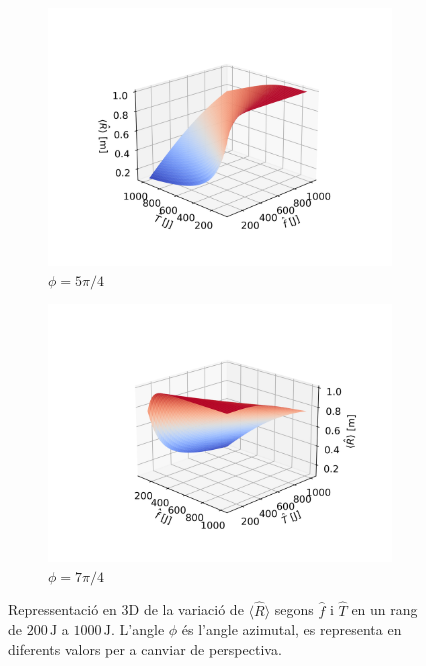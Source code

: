 \documentclass[12pt,twosides,onecolumn,openany]{article}
\begin{document}
\begin{figure}[h]
\begin{subfigure}[b]{0.48\textwidth}
         \includegraphics[width=\textwidth]{../../Lliurament_2/document_L2/plots/canvi_3D_225.png}
         \caption*{$\phi= 5\pi/4$}
         \label{fig:225}
    \end{subfigure}
    \hspace{0.3cm}
    \begin{subfigure}[b]{0.48\textwidth}
        \includegraphics[width=\textwidth]{../../Lliurament_2/document_L2/plots/canvi_3D_315.png}
        \caption*{$\phi= 7\pi/4$}
        \label{fig:215}
    \end{subfigure}
    \caption{\footnotesize Repressentació en 3D de la variació de $\langle \hat{R} \rangle$ segons $\hat{f}$ i $\hat{T}$ en un rang de \(200\,\text{J}\) a \(1000\,\text{J}\). L'angle $\phi$ és l'angle azimutal, es representa en diferents valors per a canviar de perspectiva.}
    \label{fig:3D}
\end{figure}
\end{document}
